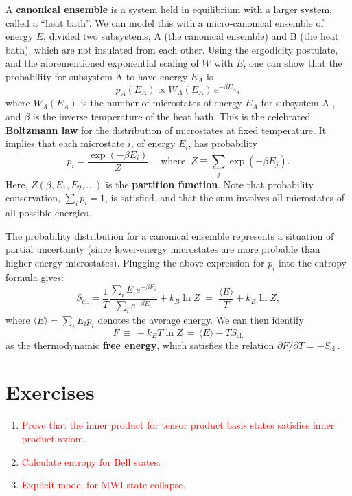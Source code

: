 \documentclass[pra,11pt]{revtex4}
\begin{document}
A \textbf{canonical ensemble} is a system held in equilibrium with a
larger system, called a ``heat bath''.  We can model this with a
micro-canonical ensemble of energy $E$, divided two subsystems, A (the
canonical ensemble) and B (the heat bath), which are not insulated
from each other.  Using the ergodicity postulate, and the
aforementioned exponential scaling of $W$ with $E$, one can show that
the probability for subsystem A to have energy $E_A$ is
$$p_A(E_A) \propto W_A(E_A) \, e^{-\beta E_A},$$
where $W_A(E_A)$ is the number of microstates of energy $E_A$ for
subsystem A , and $\beta$ is the inverse temperature of the heat bath.
This is the celebrated \textbf{Boltzmann law} for the distribution of
microstates at fixed temperature.  It implies that each microstate
$i$, of energy $E_i$, has probability
$$p_i = \frac{\exp(-\beta E_i)}{Z}, \;\;\;\mathrm{where}\;\;Z \equiv \sum_j \exp(-\beta E_j).$$
Here, $Z(\beta,E_1, E_2,\dots)$ is the \textbf{partition function}.
Note that probability conservation, $\sum_i p_i = 1$, is satisfied,
and that the sum involves all microstates of all possible energies.

The probability distribution for a canonical ensemble represents a
situation of partial uncertainty (since lower-energy microstates are
more probable than higher-energy microstates).  Plugging the above
expression for $p_i$ into the entropy formula gives:
$$S_{\mathrm{cl.}} = \frac{1}{T} \frac{\sum_i E_i e^{-\beta E_i}}{\sum_i e^{-\beta E_i}} + k_B \ln Z \;=\; \frac{\langle E\rangle}{T} + k_B \ln Z,$$
where $\langle E\rangle = \sum_i E_i p_i$ denotes the average energy.
We can then identify
$$F \,\equiv\, - k_B T \ln Z \,=\, \langle E \rangle - TS_{\mathrm{cl.}}$$
as the thermodynamic \textbf{free energy}, which satisfies the
relation $\partial F/\partial T = - S_{\mathrm{cl.}}$.



\section*{Exercises}

\begin{enumerate}
\item \textcolor{red}{Prove that the inner product for tensor product basis states satisfies inner product axiom.}
\item \textcolor{red}{Calculate entropy for Bell states.}
\item \textcolor{red}{Explicit model for MWI state collapse.}
\end{enumerate}
\end{document}
